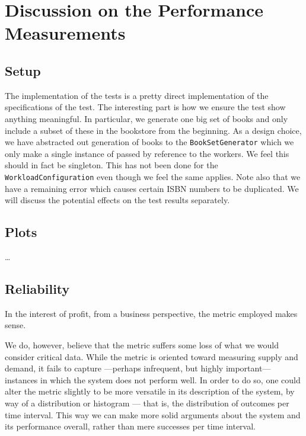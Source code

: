
\section{Discussion on the Performance Measurements}

\subsection{Setup}
The implementation of the tests is a pretty direct implementation of the
specifications of the test. The interesting part is how we ensure the test
show anything meaningful. In particular, we generate one big set of books and
only include a subset of these in the bookstore from the beginning. As a
design choice, we have abstracted out generation of books to the
{\tt BookSetGenerator} which we only make a single instance of passed by
reference to the workers. We feel this should in fact be singleton. This has
not been done for the {\tt WorkloadConfiguration} even though we feel the same
applies. Note also that we have a remaining error which causes certain ISBN
numbers to be duplicated. We will discuss the potential effects on the test
results separately.

\subsection{Plots}
\dots

\subsection{Reliability}
In the interest of profit, from a business perspective, the metric employed
makes sense.


We do, however, believe that the metric suffers some loss of what we would
consider critical data. While the metric is oriented toward measuring supply
and demand, it fails to capture ---perhaps infrequent, but highly important---
instances in which the system does not perform well. In order to do so, one
could alter the metric slightly to be more versatile in its description of the
system, by way of a distribution or histogram --- that is, the distribution of
outcomes per time interval. This way we can make more solid arguments about the
system and its performance overall, rather than mere successes per time interval.
